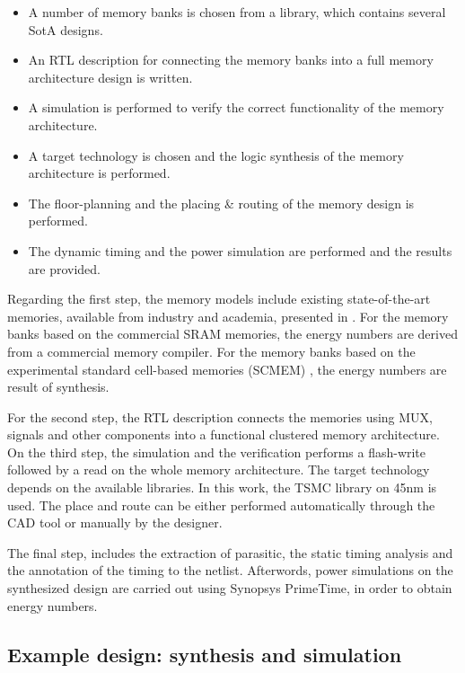 \documentclass[12pt,a4paper]{article}
\begin{document}
\begin{itemize}
	\item A number of memory banks is chosen from a library, which contains several SotA designs.
	\item An RTL description for connecting the memory banks into a full memory architecture design is written.
	\item A simulation is performed to verify the correct functionality of the memory architecture.
	\item A target technology is chosen and the logic synthesis of the memory architecture is performed.
	\item The floor-planning and the placing \& routing of the memory design is performed.
	\item The dynamic timing and the power simulation are performed and the results are provided.
\end{itemize}

Regarding the first step, the memory models include existing state-of-the-art memories, available from industry and academia, presented in \cite{filippopoulos2013exploration}.
For the memory banks based on the commercial SRAM memories, the energy numbers are derived from a commercial memory compiler.
For the memory banks based on the experimental standard cell-based memories (SCMEM) \cite{Mei11},  the energy numbers are result of synthesis.

For the second step, the RTL description connects the memories using MUX, signals and other components into a functional clustered memory architecture. 
On the third step, the simulation and the verification performs a flash-write followed by a read on the whole memory architecture. 
The target technology depends on the available libraries.
In this work, the TSMC library on 45nm is used.
The place and route can be either performed automatically through the CAD tool or manually by the designer.

The final step, includes the extraction of  parasitic, the static timing analysis and the annotation of the timing to the netlist.
Afterwords, power simulations on the synthesized design are carried out using Synopsys PrimeTime, in order to obtain energy numbers.

\subsection{Example design: synthesis and simulation}
\end{document}

